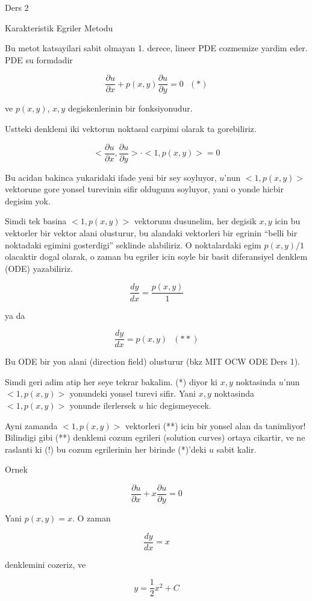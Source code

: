 \documentclass[12pt,fleqn]{article}
\begin{document}
Ders 2

Karakteristik Egriler Metodu

Bu metot katsayilari sabit olmayan 1. derece, lineer PDE cozmemize yardim
eder. PDE su formdadir

\[ \frac{\partial u}{\partial x} + 
p(x,y) \frac{\partial u}{\partial y} = 0 
\ \ \ (*)
 \]

ve $p(x,y)$, $x,y$ degiskenlerinin bir fonksiyonudur. 

Ustteki denklemi iki vektorun noktasal carpimi olarak ta gorebiliriz. 

\[ 
<\frac{\partial u}{\partial x}, \frac{\partial u}{\partial y}> \cdot 
<1,p(x,y)> = 0
 \]

Bu acidan bakinca yukaridaki ifade yeni bir sey soyluyor, $u$'nun
$<1,p(x,y)>$ vektorune gore yonsel turevinin sifir oldugunu soyluyor, yani
o yonde hicbir degisim yok. 

Simdi tek basina $<1,p(x,y)>$ vektorunu dusunelim, her degisik $x,y$ icin
bu vektorler bir vektor alani olusturur, bu alandaki vektorleri bir egrinin
``belli bir noktadaki egimini gosterdigi'' seklinde alabiliriz. O
noktalardaki egim $p(x,y) / 1$ olacaktir dogal olarak, o zaman bu egriler
icin soyle bir basit diferansiyel denklem (ODE) yazabiliriz.

\[ \frac{dy}{dx} = \frac{p(x,y)}{1} \]

ya da

\[ \frac{dy}{dx} = p(x,y) 
\ \ \ (**)
\]

Bu ODE bir yon alani (direction field) olusturur (bkz MIT OCW ODE Ders 1).

Simdi geri adim atip her seye tekrar bakalim. (*) diyor ki $x,y$ noktasinda
$u$'nun $<1,p(x,y)>$ yonundeki yonsel turevi sifir. Yani $x,y$ noktasinda
$<1,p(x,y)>$ yonunde ilerlersek $u$ hic degismeyecek. 

Ayni zamanda $<1,p(x,y)>$ vektorleri (**) icin bir yonsel alan da
tanimliyor!  Bilindigi gibi (**) denklemi cozum egrileri (solution curves)
ortaya cikartir, ve ne raslanti ki (!) bu cozum egrilerinin her birinde
(*)'deki $u$ sabit kalir. 

Ornek 

\[ \frac{\partial u}{\partial x} + 
x \frac{\partial u}{\partial y} = 0 
 \]

Yani $p(x,y) = x$. O zaman 

\[ \frac{dy}{dx} = x \]

denklemini cozeriz, ve 

\[ y = \frac{1}{2}x^2 + C \]
\end{document}
